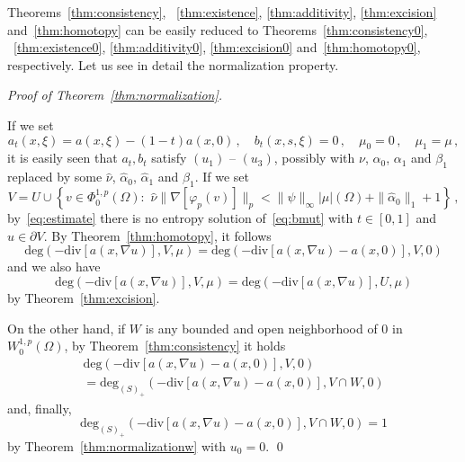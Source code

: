 \documentclass[twoside,reqno]{amsart}
\numberwithin{equation}{section}
\theoremstyle{definition}
\begin{document}
%
Theorems~\ref{thm:consistency}, ~\ref{thm:existence}, 
\ref{thm:additivity}, \ref{thm:excision} 
and~\ref{thm:homotopy} can be easily reduced to
Theorems~\ref{thm:consistency0}, ~\ref{thm:existence0}, 
\ref{thm:additivity0}, \ref{thm:excision0} 
and~\ref{thm:homotopy0}, respectively.
Let us see in detail the normalization property.
\par\smallskip\noindent
\emph{Proof of Theorem~\ref{thm:normalization}.}
\par\noindent
If we set
\[
a_t(x,\xi)=a(x,\xi) - (1-t) a(x,0)\,,
\quad b_t(x,s,\xi)=0\,,
\quad \mu_0=0\,,\quad \mu_1=\mu\,,
\]
it is easily seen that $a_t, b_t$ satisfy $(u_1)$ -- $(u_3)$,
possibly with $\nu$, $\alpha_0$, $\alpha_1$ and $\beta_1$ 
replaced by some $\hat{\nu}$, $\hat{\alpha}_0$, 
$\hat{\alpha}_1$ and $\hat{\beta}_1$.
If we set
\[
V = U\cup\left\{v\in \Phi^{1,p}_0(\Omega):\,\,
\hat{\nu}\|\nabla[\varphi_p(v)]\|_p <
\|\psi\|_\infty |\mu|(\Omega) 
+ \|\hat{\alpha}_0\|_1 +1\right\}\,,
\]
by~\eqref{eq:estimate} there is no entropy solution 
of~\eqref{eq:bmut} with $t\in[0,1]$ and $u\in\partial V$.
By Theorem~\ref{thm:homotopy}, it follows
\[
\mathrm{deg}(- \mathrm{div}[a(x,\nabla u)],V,\mu) =
\mathrm{deg}(- \mathrm{div}[a(x,\nabla u)
-a(x,0)],V,0) 
\]
and we also have
\[
\mathrm{deg}(- \mathrm{div}[a(x,\nabla u)],V,\mu) =
\mathrm{deg}(- \mathrm{div}[a(x,\nabla u)],U,\mu)
\]
by Theorem~\ref{thm:excision}.
\par
On the other hand, if $W$ is any bounded and open neighborhood 
of $0$ in $W^{1,p}_0(\Omega)$, by Theorem~\ref{thm:consistency} 
it holds
\begin{multline*}
\mathrm{deg}(- \mathrm{div}[a(x,\nabla u)-a(x,0)],V,0) \\
=
\mathrm{deg}_{(S)_+}(- \mathrm{div}[a(x,\nabla u)-a(x,0)],
V\cap W,0)
\end{multline*}
and, finally, 
\[
\mathrm{deg}_{(S)_+}(- \mathrm{div}[a(x,\nabla u)-a(x,0)],
V\cap W,0) = 1
\]
by Theorem~\ref{thm:normalizationw} with $u_0=0$.
\qed
%


\end{document}
